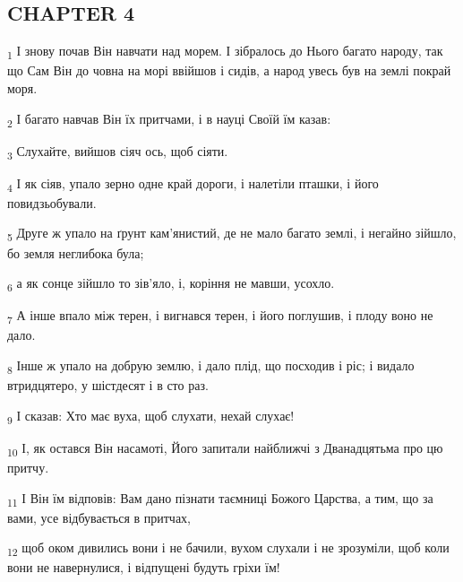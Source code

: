 \subsection{CHAPTER 4}
\begin{tcolorbox}
\textsubscript{1} І знову почав Він навчати над морем. І зібралось до Нього багато народу, так що Сам Він до човна на морі ввійшов і сидів, а народ увесь був на землі покрай моря.
\end{tcolorbox}
\begin{tcolorbox}
\textsubscript{2} І багато навчав Він їх притчами, і в науці Своїй їм казав:
\end{tcolorbox}
\begin{tcolorbox}
\textsubscript{3} Слухайте, вийшов сіяч ось, щоб сіяти.
\end{tcolorbox}
\begin{tcolorbox}
\textsubscript{4} І як сіяв, упало зерно одне край дороги, і налетіли пташки, і його повидзьобували.
\end{tcolorbox}
\begin{tcolorbox}
\textsubscript{5} Друге ж упало на ґрунт кам'янистий, де не мало багато землі, і негайно зійшло, бо земля неглибока була;
\end{tcolorbox}
\begin{tcolorbox}
\textsubscript{6} а як сонце зійшло то зів'яло, і, коріння не мавши, усохло.
\end{tcolorbox}
\begin{tcolorbox}
\textsubscript{7} А інше впало між терен, і вигнався терен, і його поглушив, і плоду воно не дало.
\end{tcolorbox}
\begin{tcolorbox}
\textsubscript{8} Інше ж упало на добрую землю, і дало плід, що посходив і ріс; і видало втридцятеро, у шістдесят і в сто раз.
\end{tcolorbox}
\begin{tcolorbox}
\textsubscript{9} І сказав: Хто має вуха, щоб слухати, нехай слухає!
\end{tcolorbox}
\begin{tcolorbox}
\textsubscript{10} І, як остався Він насамоті, Його запитали найближчі з Дванадцятьма про цю притчу.
\end{tcolorbox}
\begin{tcolorbox}
\textsubscript{11} І Він їм відповів: Вам дано пізнати таємниці Божого Царства, а тим, що за вами, усе відбувається в притчах,
\end{tcolorbox}
\begin{tcolorbox}
\textsubscript{12} щоб оком дивились вони і не бачили, вухом слухали і не зрозуміли, щоб коли вони не навернулися, і відпущені будуть гріхи їм!
\end{tcolorbox}
